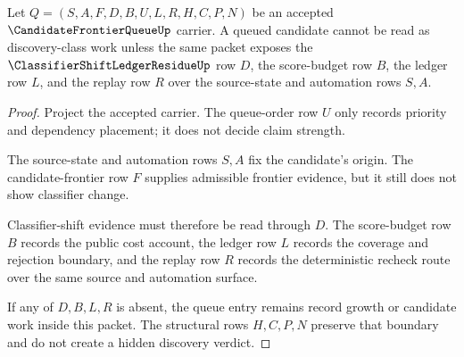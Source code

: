 \begin{theorem}
\label{thm:candidate-frontier-queue-classifier-shift-nonescape}
Let $Q=(S,A,F,D,B,U,L,R,H,C,P,N)$ be an accepted $\CandidateFrontierQueueUp$ carrier. A queued candidate cannot be read as discovery-class work unless the same packet exposes the $\ClassifierShiftLedgerResidueUp$ row $D$, the score-budget row $B$, the ledger row $L$, and the replay row $R$ over the source-state and automation rows $S,A$.
\end{theorem}
\begin{proof}
Project the accepted carrier. The queue-order row $U$ only records priority and dependency placement; it does not decide claim strength.

The source-state and automation rows $S,A$ fix the candidate's origin. The candidate-frontier row $F$ supplies admissible frontier evidence, but it still does not show classifier change.

Classifier-shift evidence must therefore be read through $D$. The score-budget row $B$ records the public cost account, the ledger row $L$ records the coverage and rejection boundary, and the replay row $R$ records the deterministic recheck route over the same source and automation surface.

If any of $D,B,L,R$ is absent, the queue entry remains record growth or candidate work inside this packet. The structural rows $H,C,P,N$ preserve that boundary and do not create a hidden discovery verdict.
\end{proof}



